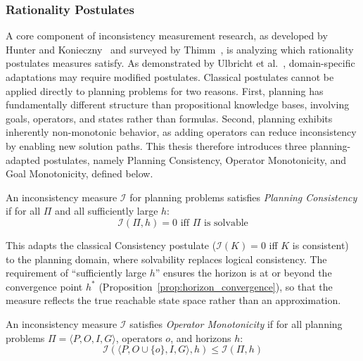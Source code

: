\subsubsection{Rationality Postulates}
\label{sec:postulates}

A core component of inconsistency measurement research, as developed by Hunter and Konieczny~\cite{Hunter2008} and surveyed by Thimm~\cite{Thimm2019}, is analyzing which rationality postulates measures satisfy. As demonstrated by Ulbricht et al.~\cite{Ulbricht2016}, domain-specific adaptations may require modified postulates. Classical postulates cannot be applied directly to planning problems for two reasons. First, planning has fundamentally different structure than propositional knowledge bases, involving goals, operators, and states rather than formulas. Second, planning exhibits inherently non-monotonic behavior, as adding operators can reduce inconsistency by enabling new solution paths. This thesis therefore introduces three planning-adapted postulates, namely Planning Consistency, Operator Monotonicity, and Goal Monotonicity, defined below.

\begin{defn}
    An inconsistency measure $\mathcal{I}$ for planning problems satisfies \emph{Planning Consistency} if for all $\Pi$ and all sufficiently large $h$:
    \begin{equation*}
        \mathcal{I}(\Pi, h) = 0 \text{ iff } \Pi \text{ is solvable}
    \end{equation*}
\end{defn}

This adapts the classical Consistency postulate ($\mathcal{I}(K) = 0$ iff $K$ is consistent) to the planning domain, where solvability replaces logical consistency. The requirement of ``sufficiently large $h$'' ensures the horizon is at or beyond the convergence point $h^*$ (Proposition~\ref{prop:horizon_convergence}), so that the measure reflects the true reachable state space rather than an approximation.

\begin{defn}
    An inconsistency measure $\mathcal{I}$ satisfies \emph{Operator Monotonicity} if for all planning problems $\Pi = \langle P, O, I, G \rangle$, operators $o$, and horizons $h$:
    \begin{equation*}
        \mathcal{I}(\langle P, O \cup \{o\}, I, G \rangle, h) \leq \mathcal{I}(\Pi, h)
    \end{equation*}
\end{defn}

